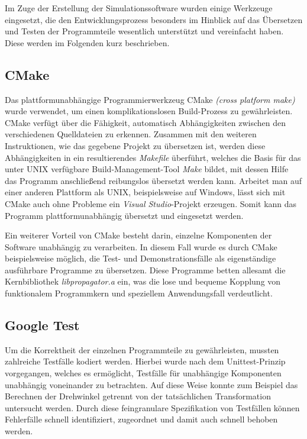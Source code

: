 Im Zuge der Erstellung der Simulationssoftware wurden einige Werkzeuge eingesetzt, die den Entwicklungsprozess besonders im Hinblick
auf das \"Ubersetzen und Testen der Programmteile wesentlich unterst\"utzt und vereinfacht haben.
Diese werden im Folgenden kurz beschrieben.

\subsection{CMake}
\label{sec:cmake}

Das plattformunabh\"angige Programmierwerkzeug CMake \textit{(cross platform make)} wurde verwendet, um einen komplikationslosen
Build-Prozess zu gew\"ahrleisten. CMake verf\"ugt \"uber die F\"ahigkeit, automatisch Abh\"angigkeiten zwischen den verschiedenen
Quelldateien zu erkennen. Zusammen mit den weiteren Instruktionen, wie das gegebene Projekt zu \"ubersetzen ist, werden diese
Abh\"angigkeiten in ein resultierendes \textit{Makefile} \"uberf\"uhrt, welches die Basis f\"ur das unter UNIX verf\"ugbare
Build-Management-Tool \textit{Make} bildet, mit dessen Hilfe das Programm anschlie{\ss}end reibungslos \"ubersetzt werden kann.
Arbeitet man auf einer anderen Plattform als UNIX, beispielsweise auf Windows, l\"asst sich mit
CMake auch ohne Probleme ein \textit{Visual Studio}-Projekt erzeugen. Somit kann das Programm plattformunabh\"angig \"ubersetzt und
eingesetzt werden.

Ein weiterer Vorteil von CMake besteht darin, einzelne Komponenten der Software unabh\"angig zu verarbeiten. In diesem Fall wurde
es durch CMake beispielsweise m\"oglich, die Test- und Demonstrationsf\"alle als eigenst\"andige ausf\"uhrbare Programme zu
\"ubersetzen. Diese Programme betten allesamt die Kernbibliothek \textit{libpropagator.a} ein, was die lose und bequeme Kopplung
von funktionalem Programmkern und speziellem Anwendungsfall verdeutlicht.

\subsection{Google Test}

Um die Korrektheit der einzelnen Programmteile zu gew\"ahrleisten, mussten zahlreiche Testf\"alle kodiert werden. Hierbei wurde
nach dem Unittest-Prinzip vorgegangen, welches es erm\"oglicht, Testf\"alle f\"ur unabh\"angige Komponenten unabh\"angig voneinander
zu betrachten. Auf diese Weise konnte zum Beispiel das Berechnen der Drehwinkel getrennt von der tats\"achlichen Transformation
untersucht werden. Durch diese feingranulare Spezifikation von Testf\"allen k\"onnen Fehlerf\"alle schnell identifiziert, zugeordnet
und damit auch schnell behoben werden.

